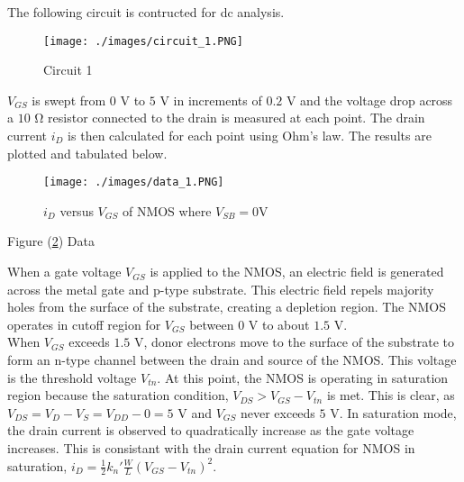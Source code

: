 The following circuit is contructed for dc analysis.

\FloatBarrier

\begin{figure}[h!]
	\centering
	\texttt{[image: ./images/circuit\_1.PNG]}
	\caption{Circuit 1}
	\label{fig:circuit_1}
\end{figure}

\FloatBarrier

$V_{GS}$ is swept from $0$ \si{\volt} to $5$ \si{\volt} in increments of $0.2$ \si{\volt} and the voltage drop across a $10$ \si{\ohm} resistor connected to the drain is measured at each point. 
The drain current $i_D$ is then calculated for each point using Ohm's law.
The results are plotted and tabulated below.

\FloatBarrier

\begin{figure}[h!]
	\centering
	\texttt{[image: ./images/data\_1.PNG]}
	\caption{$i_{D}$ versus $V_{GS}$ of NMOS where $V_{SB}= 0$\si{\volt}}
	\label{fig:data_1}
\end{figure}

\FloatBarrier

\begin{table}[h!]
	\centering
	\caption{Figure (\ref{fig:data_1}) Data}
	\label{tab:data_1}
\end{table}

\FloatBarrier

When a gate voltage $V_{GS}$ is applied to the NMOS, an electric field is generated across the metal gate and p-type substrate. 
This electric field repels majority holes from the surface of the substrate, creating a depletion region. 
The NMOS operates in cutoff region for $V_{GS}$ between $0$ \si{\volt} to about $1.5$ \si{\volt}. \\

When $V_{GS}$ exceeds $1.5$ \si{\volt}, donor electrons move to the surface of the substrate to form an n-type channel between the drain and source of the NMOS. 
This voltage is the threshold voltage $V_{tn}$. 
At this point, the NMOS is operating in saturation region because the saturation condition, $V_{DS} > V_{GS} - V_{tn}$ is met.
This is clear, as $V_{DS} = V_D - V_S = V_{DD} - 0 = 5$ \si{\volt} and $V_{GS}$ never exceeds $5$ \si{\volt}.
In saturation mode, the drain current is observed to quadratically increase as the gate voltage increases.
This is consistant with the drain current equation for NMOS in saturation, $i_D = \frac{1}{2}k_n' \frac{W}{L} (V_{GS} - V_{tn})^2$. \\


